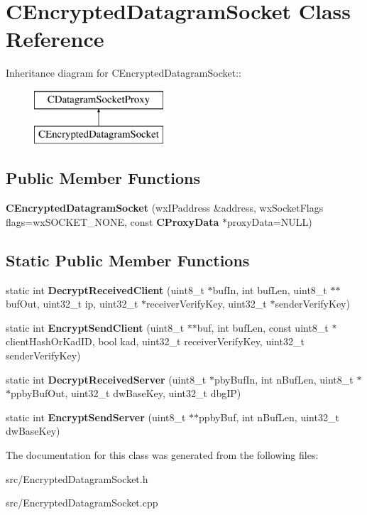 \section{CEncryptedDatagramSocket Class Reference}
\label{classCEncryptedDatagramSocket}
Inheritance diagram for CEncryptedDatagramSocket::\begin{figure}[H]
\begin{center}
\leavevmode
\includegraphics[height=2cm]{classCEncryptedDatagramSocket}
\end{center}
\end{figure}
\subsection*{Public Member Functions}
\begin{DoxyCompactItemize}
\item 
{\bfseries CEncryptedDatagramSocket} (wxIPaddress \&address, wxSocketFlags flags=wxSOCKET\_\-NONE, const {\bf CProxyData} $\ast$proxyData=NULL)\label{classCEncryptedDatagramSocket_ac2a64c1e7892fa0130063ccb73db2bae}

\end{DoxyCompactItemize}
\subsection*{Static Public Member Functions}
\begin{DoxyCompactItemize}
\item 
static int {\bfseries DecryptReceivedClient} (uint8\_\-t $\ast$bufIn, int bufLen, uint8\_\-t $\ast$$\ast$bufOut, uint32\_\-t ip, uint32\_\-t $\ast$receiverVerifyKey, uint32\_\-t $\ast$senderVerifyKey)\label{classCEncryptedDatagramSocket_ae1ab9608ef0857966fe94f15342a5ec5}

\item 
static int {\bfseries EncryptSendClient} (uint8\_\-t $\ast$$\ast$buf, int bufLen, const uint8\_\-t $\ast$clientHashOrKadID, bool kad, uint32\_\-t receiverVerifyKey, uint32\_\-t senderVerifyKey)\label{classCEncryptedDatagramSocket_a7ea93684881a27b081052b2d656e7d38}

\item 
static int {\bfseries DecryptReceivedServer} (uint8\_\-t $\ast$pbyBufIn, int nBufLen, uint8\_\-t $\ast$$\ast$ppbyBufOut, uint32\_\-t dwBaseKey, uint32\_\-t dbgIP)\label{classCEncryptedDatagramSocket_a4908ff619fccb7813a474abd44db549b}

\item 
static int {\bfseries EncryptSendServer} (uint8\_\-t $\ast$$\ast$ppbyBuf, int nBufLen, uint32\_\-t dwBaseKey)\label{classCEncryptedDatagramSocket_a9309b8945ca52bfdbb145fc0429ff631}

\end{DoxyCompactItemize}


The documentation for this class was generated from the following files:\begin{DoxyCompactItemize}
\item 
src/EncryptedDatagramSocket.h\item 
src/EncryptedDatagramSocket.cpp\end{DoxyCompactItemize}
